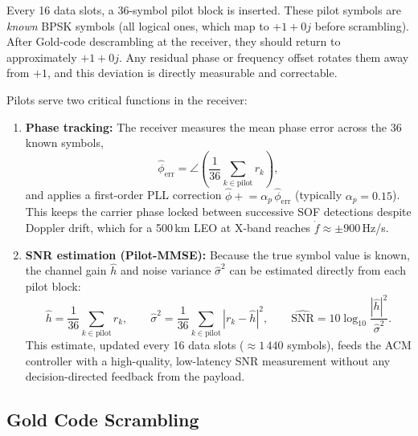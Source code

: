 \documentclass[12pt,a4paper]{report}
\begin{document}
Every 16 data slots, a 36-symbol pilot block is inserted. These pilot symbols
are \emph{known} BPSK symbols (all logical ones, which map to $+1+0j$ before
scrambling). After Gold-code descrambling at the receiver, they should return
to approximately $+1+0j$. Any residual phase or frequency offset rotates them
away from $+1$, and this deviation is directly measurable and correctable.

Pilots serve two critical functions in the receiver:

\begin{enumerate}
    \item \textbf{Phase tracking:} The receiver measures the mean phase error
    across the 36 known symbols,
    \begin{equation}
        \hat{\phi}_\text{err} = \angle\!\left(\frac{1}{36}
        \sum_{k\in\text{pilot}} r_k\right),
    \end{equation}
    and applies a first-order PLL correction $\hat{\phi} \mathrel{+}=
    \alpha_p\,\hat{\phi}_\text{err}$ (typically $\alpha_p = 0.15$).
    This keeps the carrier phase locked between successive SOF detections
    despite Doppler drift, which for a 500\,km LEO at X-band reaches
    $\dot{f}\approx\pm900$\,Hz/s.

    \item \textbf{SNR estimation (Pilot-MMSE):} Because the true symbol value
    is known, the channel gain $\hat{h}$ and noise variance
    $\hat{\sigma}^2$ can be estimated directly from each pilot block:
    \begin{equation}
        \hat{h} = \frac{1}{36}\sum_{k\in\text{pilot}} r_k,
        \qquad
        \hat{\sigma}^2 = \frac{1}{36}\sum_{k\in\text{pilot}}|r_k - \hat{h}|^2,
        \qquad
        \widehat{\mathrm{SNR}} = 10\log_{10}\frac{|\hat{h}|^2}{\hat{\sigma}^2}.
    \end{equation}
    This estimate, updated every 16 data slots ($\approx 1\,440$ symbols),
    feeds the ACM controller with a high-quality, low-latency SNR measurement
    without any decision-directed feedback from the payload.
\end{enumerate}

\subsection{Gold Code Scrambling}
\end{document}
